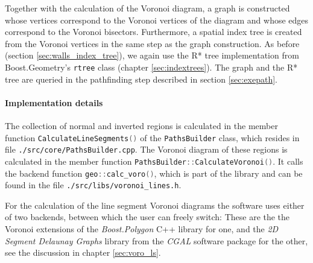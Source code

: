 Together with the calculation of the Voronoi diagram, a graph is constructed whose
vertices correspond to the Voronoi vertices of the diagram and whose edges correspond
to the Voronoi bisectors. 
Furthermore, a spatial index tree is created from the Voronoi vertices in the same 
step as the graph construction.
As before (section \ref{sec:walls_index_tree}), we again use the R* tree implementation
from Boost.Geometry's \cite{web_boost_geometry} \lstinline[language=C++]|rtree| 
class \cite{web_boost_geometry_rtree} (chapter \ref{sec:indextrees}).
The graph and the R* tree are queried in the pathfinding step described in
section \ref{sec:exepath}.

\paragraph{Implementation details}
The collection of normal and inverted regions is calculated in the member function
\lstinline[language=C++]|CalculateLineSegments()| of the \lstinline[language=C++]|PathsBuilder|
class, which resides in file \lstinline|./src/core/PathsBuilder.cpp|. 
The Voronoi diagram of these regions is calculated in the member function
\lstinline[language=C++]|PathsBuilder::CalculateVoronoi()|.
It calls the backend function \lstinline[language=C++]|geo::calc_voro()|, which is part
of the library and can be found in the file \lstinline|./src/libs/voronoi_lines.h|.

For the calculation of the line segment Voronoi diagrams the software uses either of two
backends, between which the user can freely switch: These are the the Voronoi 
extensions \cite{web_boost_polygon_voronoi} of the \textit{Boost.Polygon} 
\cite{web_boost_polygon, Simonson2009} C++ library for one,
and the \textit{2D Segment Delaunay Graphs} library \cite{web_2dsegdel, Karavelas2004, Karavelas2006} 
from the \textit{CGAL} software package \cite{web_cgal} for the other,
see the discussion in chapter \ref{sec:voro_ls}.

